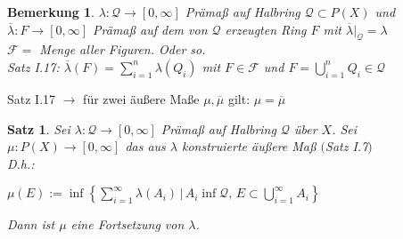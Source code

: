 \documentclass[11pt]{memoir}
\theoremstyle{changebreak}
\newtheorem{Bemerkung}{Bemerkung}[chapter]
\newtheorem{Satz}{Satz}[chapter]
\begin{document}
\begin{Bemerkung}
$\lambda: \mathscr Q \rightarrow [0, \infty]$ Prämaß auf Halbring $\mathscr Q \subset P(X)$ und $\overline{\lambda} : F \rightarrow [0, \infty]$ Prämaß auf dem von $\mathscr Q$ erzeugten Ring $F$ mit $\overline{\lambda}|_\mathscr Q = \lambda$ \\

$\mathscr  F =$ Menge aller Figuren. Oder so. \\

Satz I.17: $\overline{\lambda}(F) = \sum\limits_{i=1}^n \lambda(Q_i)$ mit $F \in \mathscr F$ und $F = \bigcup\limits_{i=1}^n Q_i \in \mathscr Q$

\end{Bemerkung}

Satz I.17 $\rightarrow$ für zwei äußere Maße $\mu, \overline{\mu}$ gilt: $\mu = \overline{\mu}$


\begin{Satz}
Sei $\lambda: \mathscr Q \rightarrow [0, \infty]$ Prämaß auf Halbring $\mathscr Q$ über $X$. Sei $\mu: P(X) \rightarrow [0, \infty]$ das aus $\lambda$ konstruierte äußere Maß $($Satz I.7$)$ \\
D.h.:
\begin{center}
	$\mu(E) := \inf\left\{\sum\limits_{i=1}^\infty \lambda(A_i) \, |\, A_i \inf\mathscr Q, \, E \subset \bigcup\limits_{i=1}^\infty A_i \right\}$
\end{center}
Dann ist $\mu$ eine Fortsetzung von $\lambda$.
\end{Satz}
\end{document}

